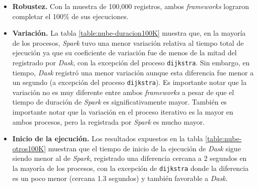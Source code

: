 \begin{itemize}
	
	\item \textbf{Robustez.} Con la muestra de 100,000 registros, ambos \textit{frameworks} lograron completar el 100\% de sus ejecuciones.
	
	\item \textbf{Variación.} La tabla \ref{table:nube-duracion100K} muestra que, en la mayoría de los procesos, \textit{Spark} tuvo una menor variación relativa al tiempo total de ejecución ya que su coeficiente de variación fue de menos de la mitad del registrado por \textit{Dask}, con la excepción del proceso \texttt{dijkstra}. Sin embargo, en tiempo, \textit{Dask} registró una menor variación aunque esta diferencia fue menor a un segundo (a excepción del proceso \texttt{dijkstra}). Es importante notar que la variación no es muy diferente entre ambos \textit{frameworks} a pesar de que el tiempo de duración de \textit{Spark} es significativamente mayor. También es importante notar que la variación en el proceso iterativo es la mayor en ambos procesos, pero la registrada por \textit{Spark} es mucho mayor.
	
	\item \textbf{Inicio de la ejecución.} Los resultados expuestos en la tabla \ref{table:nube-otros100K} muestran que el tiempo de inicio de la ejecución de \textit{Dask} sigue siendo menor al de \textit{Spark}, registrado una diferencia cercana a 2 segundos en la mayoría de los procesos, con la excepción de \texttt{dijkstra} donde la diferencia es un poco menor (cercana 1.3 segundos) y también favorable a \textit{Dask}. 
	

\end{itemize}

